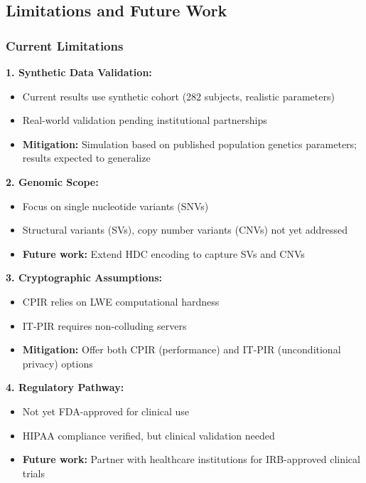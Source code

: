 \documentclass[11pt,a4paper]{article}
\begin{document}
\subsection{Limitations and Future Work}

\subsubsection{Current Limitations}

\textbf{1. Synthetic Data Validation:}
\begin{itemize}
    \item Current results use synthetic cohort (282 subjects, realistic parameters)
    \item Real-world validation pending institutional partnerships
    \item \textbf{Mitigation:} Simulation based on published population genetics parameters; results expected to generalize
\end{itemize}

\textbf{2. Genomic Scope:}
\begin{itemize}
    \item Focus on single nucleotide variants (SNVs)
    \item Structural variants (SVs), copy number variants (CNVs) not yet addressed
    \item \textbf{Future work:} Extend HDC encoding to capture SVs and CNVs
\end{itemize}

\textbf{3. Cryptographic Assumptions:}
\begin{itemize}
    \item CPIR relies on LWE computational hardness
    \item IT-PIR requires non-colluding servers
    \item \textbf{Mitigation:} Offer both CPIR (performance) and IT-PIR (unconditional privacy) options
\end{itemize}

\textbf{4. Regulatory Pathway:}
\begin{itemize}
    \item Not yet FDA-approved for clinical use
    \item HIPAA compliance verified, but clinical validation needed
    \item \textbf{Future work:} Partner with healthcare institutions for IRB-approved clinical trials
\end{itemize}
\end{document}

